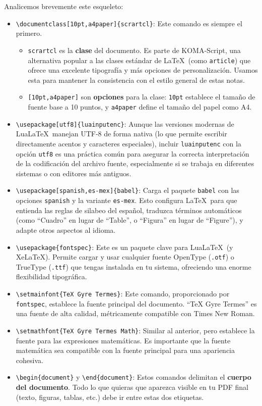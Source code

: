 Analicemos brevemente este esqueleto:
\begin{itemize}
  \item \texttt{\textbackslash documentclass[10pt,a4paper]\{scrartcl\}}: Este comando es siempre el primero.
        \begin{itemize}
          \item \texttt{scrartcl} es la \textbf{clase} del documento.
                Es parte de KOMA-Script, una alternativa popular a las clases estándar de \LaTeX\ (como \texttt{article}) que ofrece una excelente tipografía y más opciones de personalización.
                Usamos esta para mantener la consistencia con el estilo general de estas notas.
          \item \texttt{[10pt,a4paper]} son \textbf{opciones} para la clase: \texttt{10pt} establece el tamaño de fuente base a 10 puntos, y \texttt{a4paper} define el tamaño del papel como A4.
        \end{itemize}
  \item \texttt{\textbackslash usepackage[utf8]\{luainputenc\}}: Aunque las versiones modernas de Lua\LaTeX\ manejan UTF-8 de forma nativa (lo que permite escribir directamente acentos y caracteres especiales), incluir \texttt{luainputenc} con la opción \texttt{utf8} es una práctica común para asegurar la correcta interpretación de la codificación del archivo fuente, especialmente si se trabaja en diferentes sistemas o con editores más antiguos.
  \item \texttt{\textbackslash usepackage[spanish,es-mex]\{babel\}}: Carga el paquete \texttt{babel} con las opciones \texttt{spanish} y la variante \texttt{es-mex}.
        Esto configura \LaTeX\ para que entienda las reglas de silabeo del español, traduzca términos automáticos (como ``Cuadro'' en lugar de ``Table'', o ``Figura'' en lugar de ``Figure''), y adapte otros aspectos al idioma.
  \item \texttt{\textbackslash usepackage\{fontspec\}}: Este es un paquete clave para Lua\LaTeX\ (y Xe\LaTeX).
        Permite cargar y usar cualquier fuente OpenType (\texttt{.otf}) o TrueType (\texttt{.ttf}) que tengas instalada en tu sistema, ofreciendo una enorme flexibilidad tipográfica.
  \item \texttt{\textbackslash setmainfont\{TeX Gyre Termes\}}: Este comando, proporcionado por \texttt{fontspec}, establece la fuente principal del documento.
        ``TeX Gyre Termes'' es una fuente de alta calidad, métricamente compatible con Times New Roman.
  \item \texttt{\textbackslash setmathfont\{TeX Gyre Termes Math\}}: Similar al anterior, pero establece la fuente para las expresiones matemáticas.
        Es importante que la fuente matemática sea compatible con la fuente principal para una apariencia cohesiva.
  \item \texttt{\textbackslash begin\{document\}} y \texttt{\textbackslash end\{document\}}: Estos comandos delimitan el \textbf{cuerpo del documento}.
        Todo lo que quieras que aparezca visible en tu PDF final (texto, figuras, tablas, etc.) debe ir entre estas dos etiquetas.
\end{itemize}

